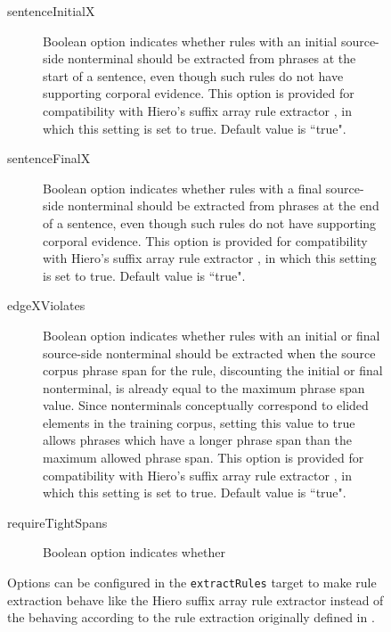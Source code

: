 \documentclass{pbml}
\newcommand{\newcite}{\namecite}
\begin{document}
\begin{figure}
\begin{description}

	\item[sentenceInitialX] Boolean option indicates whether rules with an initial source-side nonterminal should be extracted from phrases at the start of a sentence, even though such rules do not have supporting corporal evidence. This option is provided for compatibility with Hiero's suffix array rule extractor \cite{Lopez2008}, in which this setting is set to true. Default value is ``true".

	\item[sentenceFinalX] Boolean option indicates whether rules with a final source-side nonterminal should be extracted from phrases at the end of a sentence, even though such rules do not have supporting corporal evidence. This option is provided for compatibility with Hiero's suffix array rule extractor \cite{Lopez2008}, in which this setting is set to true. Default value is ``true".

	\item[edgeXViolates] Boolean option indicates whether rules with an initial or final source-side nonterminal should be extracted when the source corpus phrase span for the rule, discounting the initial or final nonterminal, is already equal to the maximum phrase span value. Since nonterminals conceptually correspond to elided elements in the training corpus, setting this value to true allows phrases which have a longer phrase span than the maximum allowed phrase span. This option is provided for compatibility with Hiero's suffix array rule extractor \cite{Lopez2008}, in which this setting is set to true. Default value is ``true".

	\item[requireTightSpans] Boolean option indicates whether

\end{description}
\caption{Options can be configured in the {\tt extractRules} target to make rule extraction behave like the Hiero suffix array rule extractor {\protect \cite{Lopez2008} } instead of the behaving according to the rule extraction originally defined in {\protect \newcite{Chiang2005}} .}
\end{figure}
\end{document}

